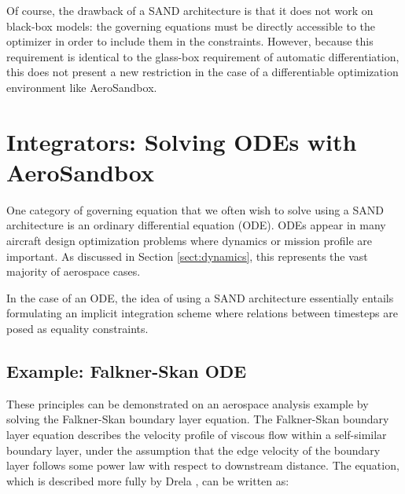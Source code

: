 Of course, the drawback of a SAND architecture is that it does not work on black-box models: the governing equations must be directly accessible to the optimizer in order to include them in the constraints. However, because this requirement is identical to the glass-box requirement of automatic differentiation, this does not present a new restriction in the case of a differentiable optimization environment like AeroSandbox.



\section{Integrators: Solving ODEs with AeroSandbox}
\label{sect:integrators}

One category of governing equation that we often wish to solve using a SAND architecture is an ordinary differential equation (ODE). ODEs appear in many aircraft design optimization problems where dynamics or mission profile are important. As discussed in Section \ref{sect:dynamics}, this represents the vast majority of aerospace cases.

In the case of an ODE, the idea of using a SAND architecture essentially entails formulating an implicit integration scheme where relations between timesteps are posed as equality constraints.



\subsection{Example: Falkner-Skan ODE}

These principles can be demonstrated on an aerospace analysis example by solving the Falkner-Skan boundary layer equation. The Falkner-Skan boundary layer equation describes the velocity profile of viscous flow within a self-similar boundary layer, under the assumption that the edge velocity of the boundary layer follows some power law with respect to downstream distance. The equation, which is described more fully by Drela \cite{avf}, can be written as:

